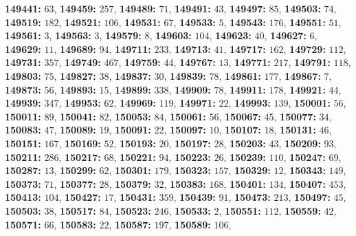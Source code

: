 \textsf{\bfseries 149441:} $63$, \textsf{\bfseries 149459:} $257$, \textsf{\bfseries 149489:} $71$, \textsf{\bfseries 149491:} $43$, \textsf{\bfseries 149497:} $85$, \textsf{\bfseries 149503:} $74$, \textsf{\bfseries 149519:} $182$, \textsf{\bfseries 149521:} $106$, \textsf{\bfseries 149531:} $67$, \textsf{\bfseries 149533:} $5$, \textsf{\bfseries 149543:} $176$, \textsf{\bfseries 149551:} $51$, \textsf{\bfseries 149561:} $3$, \textsf{\bfseries 149563:} $3$, \textsf{\bfseries 149579:} $8$, \textsf{\bfseries 149603:} $104$, \textsf{\bfseries 149623:} $40$, \textsf{\bfseries 149627:} $6$, \textsf{\bfseries 149629:} $11$, \textsf{\bfseries 149689:} $94$, \textsf{\bfseries 149711:} $233$, \textsf{\bfseries 149713:} $41$, \textsf{\bfseries 149717:} $162$, \textsf{\bfseries 149729:} $112$, \textsf{\bfseries 149731:} $357$, \textsf{\bfseries 149749:} $467$, \textsf{\bfseries 149759:} $44$, \textsf{\bfseries 149767:} $13$, \textsf{\bfseries 149771:} $217$, \textsf{\bfseries 149791:} $118$, \textsf{\bfseries 149803:} $75$, \textsf{\bfseries 149827:} $38$, \textsf{\bfseries 149837:} $30$, \textsf{\bfseries 149839:} $78$, \textsf{\bfseries 149861:} $177$, \textsf{\bfseries 149867:} $7$, \textsf{\bfseries 149873:} $56$, \textsf{\bfseries 149893:} $15$, \textsf{\bfseries 149899:} $338$, \textsf{\bfseries 149909:} $78$, \textsf{\bfseries 149911:} $178$, \textsf{\bfseries 149921:} $44$, \textsf{\bfseries 149939:} $347$, \textsf{\bfseries 149953:} $62$, \textsf{\bfseries 149969:} $119$, \textsf{\bfseries 149971:} $22$, \textsf{\bfseries 149993:} $139$, \textsf{\bfseries 150001:} $56$, \textsf{\bfseries 150011:} $89$, \textsf{\bfseries 150041:} $82$, \textsf{\bfseries 150053:} $84$, \textsf{\bfseries 150061:} $56$, \textsf{\bfseries 150067:} $45$, \textsf{\bfseries 150077:} $34$, \textsf{\bfseries 150083:} $47$, \textsf{\bfseries 150089:} $19$, \textsf{\bfseries 150091:} $22$, \textsf{\bfseries 150097:} $10$, \textsf{\bfseries 150107:} $18$, \textsf{\bfseries 150131:} $46$, \textsf{\bfseries 150151:} $167$, \textsf{\bfseries 150169:} $52$, \textsf{\bfseries 150193:} $20$, \textsf{\bfseries 150197:} $28$, \textsf{\bfseries 150203:} $43$, \textsf{\bfseries 150209:} $93$, \textsf{\bfseries 150211:} $286$, \textsf{\bfseries 150217:} $68$, \textsf{\bfseries 150221:} $94$, \textsf{\bfseries 150223:} $26$, \textsf{\bfseries 150239:} $110$, \textsf{\bfseries 150247:} $69$, \textsf{\bfseries 150287:} $13$, \textsf{\bfseries 150299:} $62$, \textsf{\bfseries 150301:} $179$, \textsf{\bfseries 150323:} $157$, \textsf{\bfseries 150329:} $12$, \textsf{\bfseries 150343:} $149$, \textsf{\bfseries 150373:} $71$, \textsf{\bfseries 150377:} $28$, \textsf{\bfseries 150379:} $32$, \textsf{\bfseries 150383:} $168$, \textsf{\bfseries 150401:} $134$, \textsf{\bfseries 150407:} $453$, \textsf{\bfseries 150413:} $104$, \textsf{\bfseries 150427:} $17$, \textsf{\bfseries 150431:} $359$, \textsf{\bfseries 150439:} $91$, \textsf{\bfseries 150473:} $213$, \textsf{\bfseries 150497:} $45$, \textsf{\bfseries 150503:} $38$, \textsf{\bfseries 150517:} $84$, \textsf{\bfseries 150523:} $246$, \textsf{\bfseries 150533:} $2$, \textsf{\bfseries 150551:} $112$, \textsf{\bfseries 150559:} $42$, \textsf{\bfseries 150571:} $66$, \textsf{\bfseries 150583:} $22$, \textsf{\bfseries 150587:} $197$, \textsf{\bfseries 150589:} $106$, 
